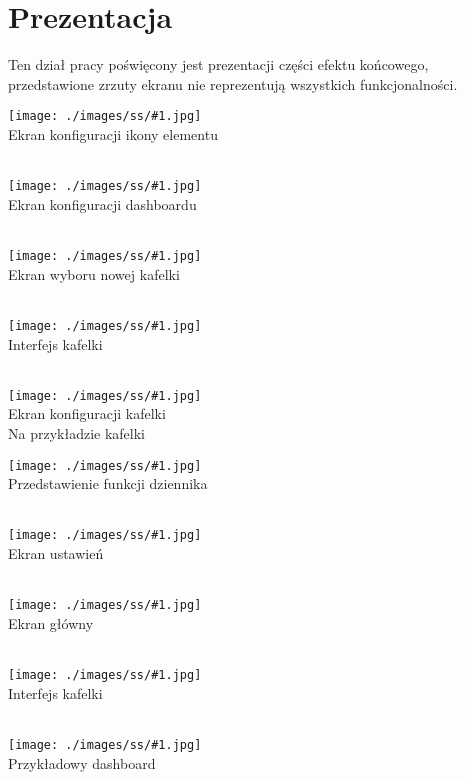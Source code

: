 \newcommand{\screenShot}[2]{
    \begin{minipage}{0.48\textwidth}
        \centering
        \texttt{[image: ./images/ss/\#1.jpg]}\\
        #2
    \end{minipage}
}

\section{Prezentacja}
Ten dział pracy poświęcony jest prezentacji części efektu końcowego, przedstawione zrzuty ekranu nie reprezentują wszystkich funkcjonalności.\\

\screenShot{1}{Ekran konfiguracji ikony elementu\\\ }
\screenShot{2}{Ekran konfiguracji dashboardu\\\ }

\newpage

\screenShot{3}{Ekran wyboru nowej kafelki\\\ }
\screenShot{4}{Interfejs kafelki \\\ }

\newpage

\screenShot{5}{Ekran konfiguracji kafelki\\Na przykładzie kafelki \tcbox{Switch}}
\screenShot{6}{Przedstawienie funkcji dziennika\\\ }

\newpage

\screenShot{7}{Ekran ustawień\\\ }
\screenShot{8}{Ekran główny\\\ }

\newpage

\screenShot{9}{Interfejs kafelki \\\ }
\screenShot{10}{Przykładowy dashboard\\\ }